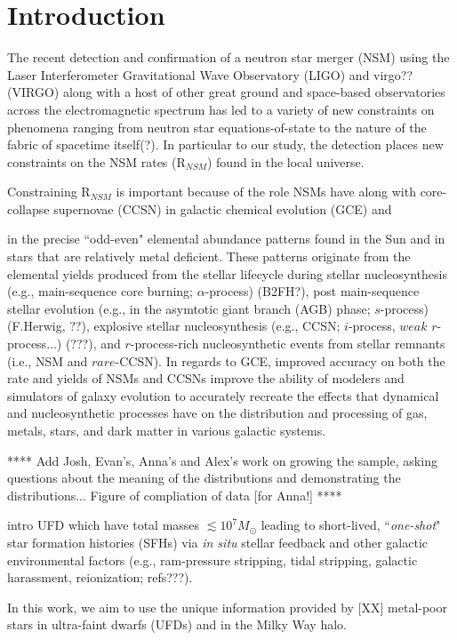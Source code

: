\section{Introduction}
\label{intro} 
The recent detection and confirmation of a neutron star merger (NSM) using the Laser Interferometer Gravitational Wave Observatory (LIGO) and virgo?? (VIRGO) along with a host of other great ground and space-based observatories across the electromagnetic spectrum has led to a variety of new constraints on phenomena ranging from neutron star equations-of-state to the nature of the fabric of spacetime itself(?). In particular to our study, the detection places new constraints on the NSM rates (R$_{NSM}$) found in the local universe. 

Constraining R$_{NSM}$ is important because of the role NSMs have along with core-collapse supernovae (CCSN) in galactic chemical evolution (GCE) and

in the precise ``odd-even" elemental abundance patterns found in the Sun and in stars that are relatively metal deficient. These patterns originate from the elemental yields produced from the stellar lifecycle during stellar nucleosynthesis (e.g., main-sequence core burning; $\alpha$-process) (B2FH?), post main-sequence stellar evolution (e.g., in the asymtotic giant branch (AGB) phase; $s$-process) (F.Herwig, ??), explosive stellar nucleosynthesis (e.g., CCSN; $i$-process, $weak$ $r$-process...) (???), and $r$-process-rich nucleosynthetic events from stellar remnants (i.e., NSM and $rare$-CCSN). In regards to GCE, improved accuracy on both the rate and yields of NSMs and CCSNs improve the ability of modelers and simulators of galaxy evolution to accurately recreate the effects that dynamical and nucleosynthetic processes have on the distribution and processing of gas, metals, stars, and dark matter in various galactic systems.

****
Add Josh, Evan's, Anna's and Alex's work on growing the sample, asking questions about the meaning of the distributions and demonstrating the distributions... Figure of compliation of data [for Anna!]
****

intro UFD
which have total masses $\lesssim10^7 M_\odot$
leading to short-lived, ``{\it one-shot}" star formation histories (SFHs) via {\it in situ} stellar feedback and other galactic environmental factors (e.g., ram-pressure stripping, tidal stripping, galactic harassment, reionization; refs???). 


In this work, we aim to use the unique information provided by [XX] metal-poor stars in ultra-faint dwarfs (UFDs) and in the Milky Way halo.


